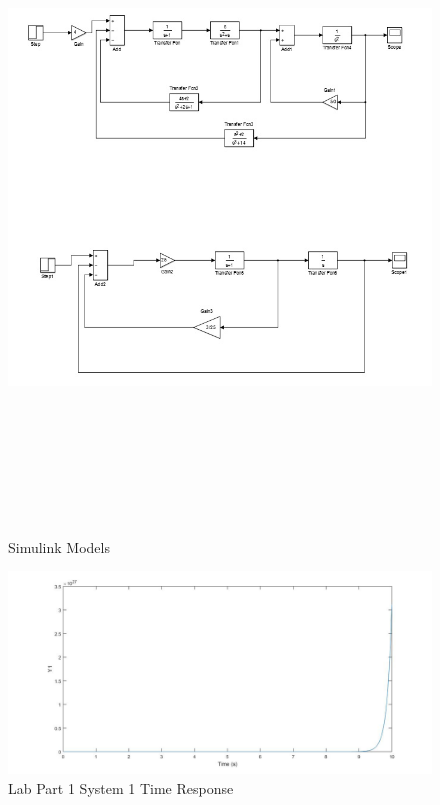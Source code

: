 \documentclass[12pt]{article}
\begin{document}
\begin{figure}[h!] %
   \centering
   \includegraphics[width=\linewidth,height=7in]{simulink_models.jpg} 
   \caption{Simulink Models}
   \label{fig:example}
\end{figure}

\newpage

\begin{figure}[h!] %
   \centering
   \includegraphics[width=\linewidth]{time_response_system_1.jpg} 
   \caption{Lab Part 1 System 1 Time Response}
   \label{fig:example}
\end{figure}
\end{document}
